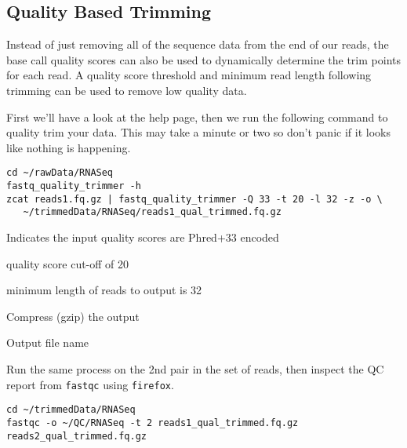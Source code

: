 \subsection{Quality Based Trimming}
Instead of just removing all of the sequence data from the end of our reads, the base call quality scores can also be used to dynamically determine the trim points for each read. 
A quality score threshold and minimum read length following trimming can be used to remove low quality data. \\
\begin{steps}
First we'll have a look at the help page, then we  run the following command to quality trim your data.
This may take a minute or two so don't panic if it looks like nothing is happening.
\begin{lstlisting}
cd ~/rawData/RNASeq
fastq_quality_trimmer -h
zcat reads1.fq.gz | fastq_quality_trimmer -Q 33 -t 20 -l 32 -z -o \
   ~/trimmedData/RNASeq/reads1_qual_trimmed.fq.gz
\end{lstlisting}
\end{steps}

\begin{note}
\begin{description}[style=multiline,labelindent=0cm,align=right,leftmargin=0.8\descriptionlabelspace,rightmargin=1.5cm,font=\ttfamily]
\item[-Q 33] Indicates the input quality scores are Phred+33 encoded
\item[-t 20] quality score cut-off of 20
\item[-l 32] minimum length of reads to output is 32
\item[-z] Compress (gzip) the output
\item[-o] Output file name
\end{description}
\end{note}

\begin{steps}
Run the same process on the 2nd pair in the set of reads, then inspect the QC report from \texttt{fastqc} using \texttt{firefox}.
\begin{lstlisting}
cd ~/trimmedData/RNASeq
fastqc -o ~/QC/RNASeq -t 2 reads1_qual_trimmed.fq.gz reads2_qual_trimmed.fq.gz
\end{lstlisting}
\end{steps}

